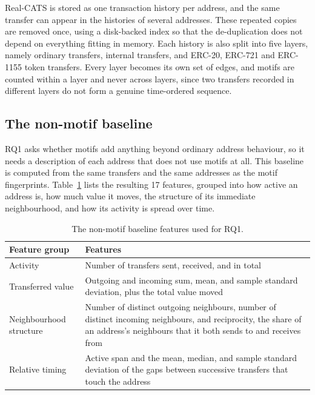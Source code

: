 \documentclass{thesisclass}
\begin{document}
Real-CATS is stored as one transaction history per address, and the same
transfer can appear in the histories of several addresses. These repeated copies
are removed once, using a disk-backed index so that the de-duplication does not
depend on everything fitting in memory. Each history is also split into five
layers, namely ordinary transfers, internal transfers, and ERC-20, ERC-721 and
ERC-1155 token transfers. Every layer becomes its own set of edges, and motifs
are counted within a layer and never across layers, since two transfers recorded
in different layers do not form a genuine time-ordered sequence.

\subsection{The non-motif baseline}

RQ1 asks whether motifs add anything beyond ordinary address behaviour, so it
needs a description of each address that does not use motifs at all. This
baseline is computed from the same transfers and the same addresses as the motif
fingerprints. Table~\ref{tab:results_baseline_features} lists the resulting 17
features, grouped into how active an address is, how much value it moves, the
structure of its immediate neighbourhood, and how its activity is spread over
time.

\begin{table}[ht]
\centering
\caption{The non-motif baseline features used for RQ1.}
\label{tab:results_baseline_features}
\small
\begin{tabular}{@{}p{3.4cm} p{9.5cm}@{}}
\toprule
\textbf{Feature group} & \textbf{Features} \\
\midrule
Activity &
Number of transfers sent, received, and in total \\[2pt]
Transferred value &
Outgoing and incoming sum, mean, and sample standard deviation, plus the total
value moved \\[2pt]
Neighbourhood structure &
Number of distinct outgoing neighbours, number of distinct incoming neighbours,
and reciprocity, the share of an address's neighbours that it both sends to and
receives from \\[2pt]
Relative timing &
Active span and the mean, median, and sample standard deviation of the gaps
between successive transfers that touch the address \\
\bottomrule
\end{tabular}
\end{table}
\end{document}
